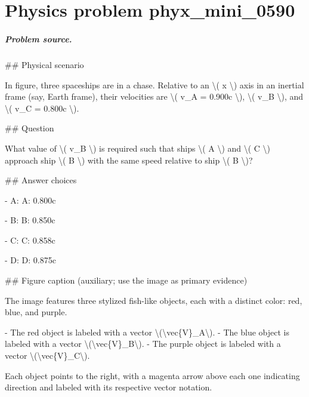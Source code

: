 
\chapter{Physics problem phyx\_mini\_0590}
\label{ch:PhyXMiniProblems_problem_phyx_mini_0590}

\paragraph{Problem source.}
\#\# Physical scenario

In figure, three spaceships are in a chase. Relative to an \textbackslash{}( x \textbackslash{}) axis in an inertial frame (say, Earth frame), their velocities are \textbackslash{}( v\_A = 0.900c \textbackslash{}), \textbackslash{}( v\_B \textbackslash{}), and \textbackslash{}( v\_C = 0.800c \textbackslash{}).

\#\# Question

What value of \textbackslash{}( v\_B \textbackslash{}) is required such that ships \textbackslash{}( A \textbackslash{}) and \textbackslash{}( C \textbackslash{}) approach ship \textbackslash{}( B \textbackslash{}) with the same speed relative to ship \textbackslash{}( B \textbackslash{})?

\#\# Answer choices

- A: A: 0.800c

- B: B: 0.850c

- C: C: 0.858c

- D: D: 0.875c

\#\# Figure caption (auxiliary; use the image as primary evidence)

The image features three stylized fish-like objects, each with a distinct color: red, blue, and purple. 

- The red object is labeled with a vector \textbackslash{}(\textbackslash{}vec\{V\}\_A\textbackslash{}).
- The blue object is labeled with a vector \textbackslash{}(\textbackslash{}vec\{V\}\_B\textbackslash{}).
- The purple object is labeled with a vector \textbackslash{}(\textbackslash{}vec\{V\}\_C\textbackslash{}).

Each object points to the right, with a magenta arrow above each one indicating direction and labeled with its respective vector notation.


